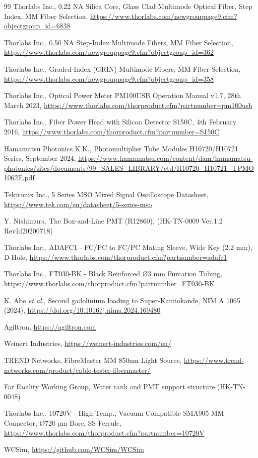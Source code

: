 \documentclass[a4paper,11pt]{article}
\begin{document}
\begin{thebibliography}{99}
Thorlabs Inc., 0.22 NA Silica Core, Glass Clad Multimode Optical Fiber, Step Index, MM Fiber Selection, \url{https://www.thorlabs.com/newgrouppage9.cfm?objectgroup_id=6838}

Thorlabs Inc., 0.50 NA Step-Index Multimode Fibers, MM Fiber Selection, \url{https://www.thorlabs.com/newgrouppage9.cfm?objectgroup_id=362}

Thorlabs Inc., Graded-Index (GRIN) Multimode Fibers, MM Fiber Selection, \url{https://www.thorlabs.com/newgrouppage9.cfm?objectgroup_id=358}


Thorlabs Inc., Optical Power Meter PM100USB Operation Manual v1.7, 28th March 2023, \url{https://www.thorlabs.com/thorproduct.cfm?partnumber=pm100usb}

Thorlabs Inc., Fiber Power Head with Silicon Detector S150C, 4th February 2016, \url{https://www.thorlabs.com/thorproduct.cfm?partnumber=S150C}

Hamamatsu Photonics K.K., Photomultiplier Tube Modules H10720/H10721 Series, September 2024, \url{https://www.hamamatsu.com/content/dam/hamamatsu-photonics/sites/documents/99_SALES_LIBRARY/etd/H10720_H10721_TPMO1062E.pdf}

Tektronix Inc., 5 Series MSO Mixed Signal Oscilloscope Datasheet, \url{https://www.tek.com/en/datasheet/5-series-mso}

Y. Nishimura, The Box-and-Line PMT (R12860), (HK-TN-0009 Ver.1.2 RevId20200718)

Thorlabs Inc., ADAFC1 - FC/PC to FC/PC Mating Sleeve, Wide Key (2.2 mm), D-Hole, \url{https://www.thorlabs.com/thorproduct.cfm?partnumber=adafc1}

Thorlabs Inc., FT030-BK - Black Reinforced Ø3 mm Furcation Tubing, \url{https://www.thorlabs.com/thorproduct.cfm?partnumber=FT030-BK}

K. Abe {\it et al.}, Second gadolinium loading to Super-Kamiokande, NIM A 1065 (2024), \url{https://doi.org/10.1016/j.nima.2024.169480}


Agiltron, \url{https://agiltron.com}

Weinert Industries, \url{https://weinert-industries.com/en/}

TREND Networks, FibreMaster MM 850nm Light Source, \url{https://www.trend-networks.com/product/cable-tester-fibermaster/}


Far Facility Working Group, Water tank and PMT support structure (HK-TN-0048)

Thorlabs Inc., 10720V - High-Temp., Vacuum-Compatible SMA905 MM Connector, Ø720 µm Bore, SS Ferrule, \url{https://www.thorlabs.com/thorproduct.cfm?partnumber=10720V}


WCSim, \url{https://github.com/WCSim/WCSim}

\end{thebibliography}
\end{document}
